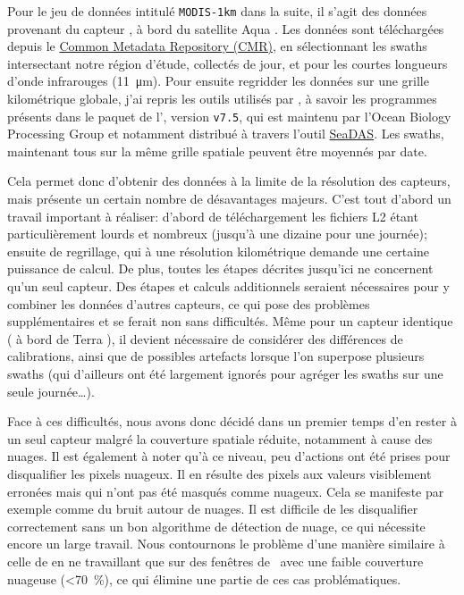 Pour le jeu de données intitulé \verb|MODIS-1km| dans la suite, il s'agit des données provenant du capteur , à bord du satellite Aqua \parencite{kilpatrick_2015}.
Les données sont téléchargées depuis le \href{https://cmr.earthdata.nasa.gov/search/}{Common Metadata Repository (CMR)}, en sélectionnant les swaths intersectant notre région d'étude, collectés de jour, et pour les courtes longueurs d'onde infrarouges (\qty{11}{\um}).
Pour ensuite regridder les données sur une grille kilométrique globale, j'ai repris les outils utilisés par \textcite{liu_2016}, à savoir les programmes présents dans le paquet de l'\href{https://oceandata.sci.gsfc.nasa.gov/ocssw}{}, version \verb|v7.5|, qui est maintenu par l'Ocean Biology Processing Group et notamment distribué à travers l'outil \href{https://seadas.gsfc.nasa.gov/}{SeaDAS}.
Les swaths, maintenant tous sur la même grille spatiale peuvent être moyennés par date.

Cela permet donc d'obtenir des données à la limite de la résolution des capteurs, mais présente un certain nombre de désavantages majeurs.
C'est tout d'abord un travail important à réaliser: d'abord de téléchargement les fichiers L2 étant particulièrement lourds et nombreux (jusqu'à une dizaine pour une journée); ensuite de regrillage, qui à une résolution kilométrique demande une certaine puissance de calcul.
De plus, toutes les étapes décrites jusqu'ici ne concernent qu'un seul capteur.
Des étapes et calculs additionnels seraient nécessaires pour y combiner les données d'autres capteurs, ce qui pose des problèmes supplémentaires et se ferait non sans difficultés.
Même pour un capteur identique ( à bord de Terra ), il devient nécessaire de considérer des différences de calibrations, ainsi que de possibles artefacts lorsque l'on superpose plusieurs swaths (qui d'ailleurs ont été largement ignorés pour agréger les swaths sur une seule journée\dots).

Face à ces difficultés, nous avons donc décidé dans un premier temps d'en rester à un seul capteur malgré la couverture spatiale réduite, notamment à cause des nuages.
Il est également à noter qu'à ce niveau, peu d'actions ont été prises pour disqualifier les pixels nuageux.
Il en résulte des pixels aux valeurs visiblement erronées mais qui n'ont pas été masqués comme nuageux.
Cela se manifeste par exemple comme du bruit autour de nuages.
Il est difficile de les disqualifier correctement sans un bon algorithme de détection de nuage, ce qui nécessite encore un large travail.
Nous contournons le problème d'une manière similaire à celle de \textcite{liu_2016} en ne travaillant que sur des fenêtres de~ avec une faible couverture nuageuse (\textless\qty{70}{\percent}), ce qui élimine une partie de ces cas problématiques.

